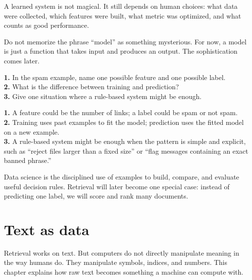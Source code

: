 \documentclass[11pt,oneside]{report}
\begin{document}
\begin{warningbox}
A learned system is not magical. It still depends on human choices: what data were collected, which features were built, what metric was optimized, and what counts as good performance.
\end{warningbox}

\begin{notebox}
Do not memorize the phrase ``model'' as something mysterious. For now, a model is just a function that takes input and produces an output. The sophistication comes later.
\end{notebox}

\begin{selfcheckbox}
\textbf{1.} In the spam example, name one possible feature and one possible label.\\
\textbf{2.} What is the difference between training and prediction?\\
\textbf{3.} Give one situation where a rule-based system might be enough.
\end{selfcheckbox}

\begin{answerbox}
\textbf{1.} A feature could be the number of links; a label could be spam or not spam.\\
\textbf{2.} Training uses past examples to fit the model; prediction uses the fitted model on a new example.\\
\textbf{3.} A rule-based system might be enough when the pattern is simple and explicit, such as ``reject files larger than a fixed size'' or ``flag messages containing an exact banned phrase.''
\end{answerbox}

\begin{rememberbox}
Data science is the disciplined use of examples to build, compare, and evaluate useful decision rules. Retrieval will later become one special case: instead of predicting one label, we will score and rank many documents.
\end{rememberbox}


\chapter[Text as Data]{Text as data}

\begin{purposebox}
Retrieval works on text. But computers do not directly manipulate meaning in the way humans do. They manipulate symbols, indices, and numbers. This chapter explains how raw text becomes something a machine can compute with.
\end{purposebox}
\end{document}
